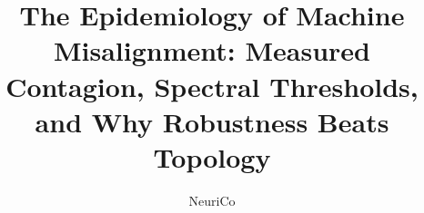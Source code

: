 \documentclass{article}
\title{The Epidemiology of Machine Misalignment: Measured Contagion,
Spectral Thresholds, and Why Robustness Beats Topology}
\author{NeuriCo}
\begin{document}
\maketitle

\begin{abstract}

\end{abstract}









\end{document}
